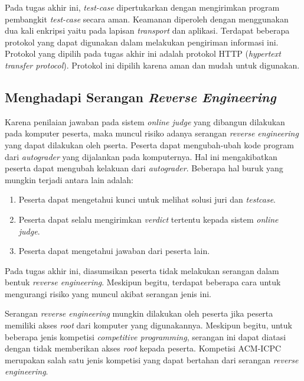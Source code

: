 \par Pada tugas akhir ini, \textit{test-case} dipertukarkan dengan mengirimkan program pembangkit \textit{test-case} secara aman. Keamanan diperoleh dengan menggunakan dua kali enkripsi yaitu pada lapisan \textit{transport} dan aplikasi. Terdapat beberapa protokol yang dapat digunakan dalam melakukan pengiriman informasi ini. Protokol yang dipilih pada tugas akhir ini adalah protokol HTTP (\textit{hypertext transfer protocol}). Protokol ini dipilih karena aman dan mudah untuk digunakan.

\subsection{Menghadapi Serangan \textit{Reverse Engineering}}

\par Karena penilaian jawaban pada sistem \textit{online judge} yang dibangun dilakukan pada komputer peserta, maka muncul risiko adanya serangan \textit{reverse engineering} yang dapat dilakukan oleh pserta. Peserta dapat mengubah-ubah kode program dari \textit{autograder} yang dijalankan pada komputernya. Hal ini mengakibatkan peserta dapat mengubah kelakuan dari \textit{autograder}. Beberapa hal buruk yang mungkin terjadi antara lain adalah:
\begin{enumerate}
    \item Peserta dapat mengetahui kunci untuk melihat solusi juri dan \textit{testcase}.
    \item Peserta dapat selalu mengirimkan \textit{verdict} tertentu kepada sistem \textit{online judge}.
    \item Peserta dapat mengetahui jawaban dari peserta lain.
\end{enumerate}
Pada tugas akhir ini, diasumsikan peserta tidak melakukan serangan dalam bentuk \textit{reverse engineering}. Meskipun begitu, terdapat beberapa cara untuk mengurangi risiko yang muncul akibat serangan jenis ini.

\par Serangan \textit{reverse engineering} mungkin dilakukan oleh peserta jika peserta memiliki akses \textit{root} dari komputer yang digunakannya. Meskipun begitu, untuk beberapa jenis kompetisi \textit{competitive programming}, serangan ini dapat diatasi dengan tidak memberikan akses \textit{root} kepada peserta. Kompetisi ACM-ICPC merupakan salah satu jenis kompetisi yang dapat bertahan dari serangan \textit{reverse engineering}.

